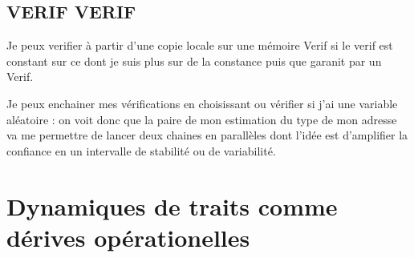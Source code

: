\documentclass{article}
\begin{document}
 \subsection{VERIF VERIF}
  Je peux verifier à partir d'une copie locale sur une mémoire Verif si le verif  est constant sur ce dont je suis plus sur de la constance puis que garanit par un Verif.
 
 Je peux enchainer mes vérifications en choisissant ou vérifier si j'ai une variable aléatoire : on voit donc que la paire de mon estimation du type de mon adresse va me permettre de lancer deux chaines en parallèles dont l'idée est d'amplifier la confiance  en un intervalle de stabilité ou de variabilité.
 
 \section{Dynamiques de traits comme dérives opérationelles}
\end{document}
